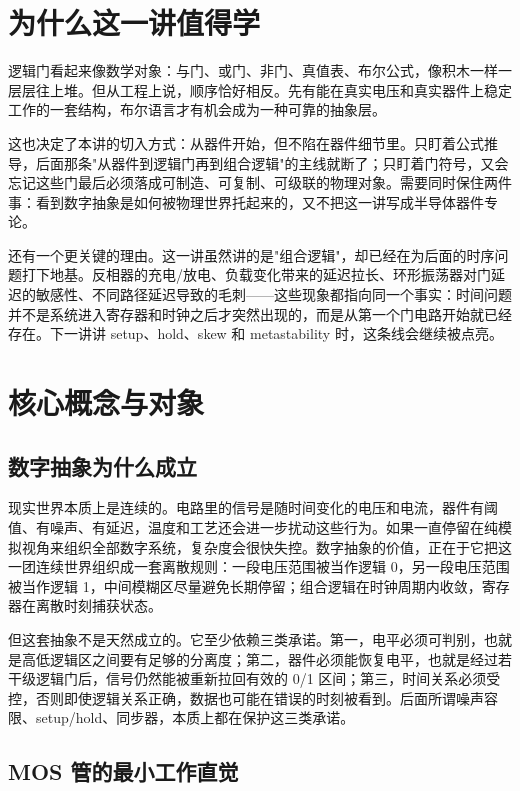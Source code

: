 \documentclass[11pt,a4paper]{article}
\begin{document}
\section{为什么这一讲值得学}

逻辑门看起来像数学对象：与门、或门、非门、真值表、布尔公式，像积木一样一层层往上堆。但从工程上说，顺序恰好相反。先有能在真实电压和真实器件上稳定工作的一套结构，布尔语言才有机会成为一种可靠的抽象层。

这也决定了本讲的切入方式：从器件开始，但不陷在器件细节里。只盯着公式推导，后面那条"从器件到逻辑门再到组合逻辑"的主线就断了；只盯着门符号，又会忘记这些门最后必须落成可制造、可复制、可级联的物理对象。需要同时保住两件事：看到数字抽象是如何被物理世界托起来的，又不把这一讲写成半导体器件专论。

还有一个更关键的理由。这一讲虽然讲的是"组合逻辑"，却已经在为后面的时序问题打下地基。反相器的充电/放电、负载变化带来的延迟拉长、环形振荡器对门延迟的敏感性、不同路径延迟导致的毛刺——这些现象都指向同一个事实：时间问题并不是系统进入寄存器和时钟之后才突然出现的，而是从第一个门电路开始就已经存在。下一讲讲 setup、hold、skew 和 metastability 时，这条线会继续被点亮。

\section{核心概念与对象}

\subsection{数字抽象为什么成立}

现实世界本质上是连续的。电路里的信号是随时间变化的电压和电流，器件有阈值、有噪声、有延迟，温度和工艺还会进一步扰动这些行为。如果一直停留在纯模拟视角来组织全部数字系统，复杂度会很快失控。数字抽象的价值，正在于它把这一团连续世界组织成一套离散规则：一段电压范围被当作逻辑 0，另一段电压范围被当作逻辑 1，中间模糊区尽量避免长期停留；组合逻辑在时钟周期内收敛，寄存器在离散时刻捕获状态。

但这套抽象不是天然成立的。它至少依赖三类承诺。第一，电平必须可判别，也就是高低逻辑区之间要有足够的分离度；第二，器件必须能恢复电平，也就是经过若干级逻辑门后，信号仍然能被重新拉回有效的 0/1 区间；第三，时间关系必须受控，否则即使逻辑关系正确，数据也可能在错误的时刻被看到。后面所谓噪声容限、setup/hold、同步器，本质上都在保护这三类承诺。

\subsection{MOS 管的最小工作直觉}
\end{document}
